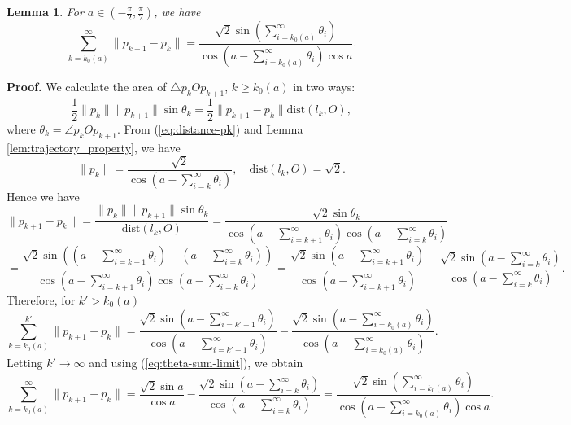 \documentclass[12pt]{article}
\newtheorem{lemma}{Lemma}
\begin{document}
\begin{lemma}\label{cor:leng}
For $a \in \left(-\frac{\pi}{2}, \frac{\pi}{2}\right)$, we have  
\begin{equation*}
\sum_{k=k_0(a)}^{\infty} \|p_{k+1} - p_{k}\| =  
\frac{\sqrt{2} \sin \left(\sum_{i=k_0(a)}^{\infty} \theta_i\right) }{\cos \left(a - \sum_{i=k_0(a)}^{\infty} \theta_i\right) \cos a}.
\end{equation*}
\end{lemma}
\textbf{Proof.}
We calculate the area of $\triangle p_{k}Op_{k+1}$, $k \geq k_0(a)$ in two ways:
$$
\frac{1}{2} \|p_{k}\| \|p_{k+1}\| \sin \theta_k
= \frac{1}{2} \|p_{k+1}-p_{k}\| \text{dist}(l_k,O),
$$
where $\theta_k =\angle p_{k}Op_{k+1}$.
From (\ref{eq:distance-pk}) and Lemma \ref{lem:trajectory_property}, we have
$$
\|p_{k}\| =   \frac{\sqrt{2}}{\cos \left(a - \sum_{i=k}^{\infty} \theta_i\right)},
\quad 
\text{dist}(l_k,O)= \sqrt{2}.
$$
Hence we have
\begin{equation*}
  \|p_{k+1}-p_{k}\| =\frac{\|p_{k}\| \|p_{k+1}\| \sin \theta_k}{ \text{dist}(l_k,O)}
  = 
  \frac{\sqrt{2} \sin \theta_k }{
    \cos \left(a - \sum_{i=k+1}^{\infty} \theta_i\right) 
    \cos \left(a - \sum_{i=k}^{\infty} \theta_i\right)}
\end{equation*}
$$
=  \frac{\sqrt{2} 
\sin \left(
  \left(a - \sum_{i=k+1}^{\infty} \theta_i\right) 
  -
  \left(a - \sum_{i=k}^{\infty} \theta_i\right)
\right)
}{
  \cos \left(a - \sum_{i=k+1}^{\infty} \theta_i\right) 
  \cos \left(a - \sum_{i=k}^{\infty} \theta_i\right)}
=
\frac{\sqrt{2} 
\sin 
  \left(a - \sum_{i=k+1}^{\infty} \theta_i\right) 
}{
  \cos \left(a - \sum_{i=k+1}^{\infty} \theta_i\right)}
  -
  \frac{\sqrt{2} 
\sin
  \left(a - \sum_{i=k}^{\infty} \theta_i\right) 
}{
  \cos 
  \left(a - \sum_{i=k}^{\infty} \theta_i\right)}.
$$
Therefore, for $k' > k_0(a)$
\begin{equation*}
\sum_{k=k_0(a)}^{k'} \|p_{k+1} - p_{k}\|
=
\frac{\sqrt{2} 
\sin 
  \left(a - \sum_{i=k'+1}^{\infty} \theta_i\right) 
}{
  \cos \left(a - \sum_{i=k'+1}^{\infty} \theta_i\right)}
  -
  \frac{\sqrt{2} 
\sin
  \left(a - \sum_{i=k_0(a)}^{\infty} \theta_i\right) 
}{
  \cos \left(a - \sum_{i=k_0(a)}^{\infty} \theta_i\right)}.
\end{equation*}
Letting $k' \to \infty$ and using (\ref{eq:theta-sum-limit}), we obtain
\begin{equation*}
  \sum_{k=k_0(a)}^{\infty} \|p_{k+1} - p_{k}\|
  =
  \frac{\sqrt{2} 
  \sin a
  }{
    \cos a}
    -
    \frac{\sqrt{2} 
  \sin 
    \left(a - \sum_{i=k}^{\infty} \theta_i\right) 
  }{
    \cos \left(a - \sum_{i=k}^{\infty} \theta_i\right)}
  =
  \frac{\sqrt{2} \sin \left(\sum_{i=k_0(a)}^{\infty} \theta_i\right) }{\cos \left(a - \sum_{i=k_0(a)}^{\infty} \theta_i\right) \cos a}.
  \end{equation*}
\end{document}
